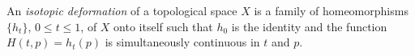 An \textit{isotopic deformation} of a topological space $X$ is a family of homeomorphisms $\{h_t\}$, $0 \leq t \leq 1$, of $X$ onto itself such that $h_0$ is the identity and the function $H(t,p) = h_t(p)$ is simultaneously continuous in $t$ and $p$.
